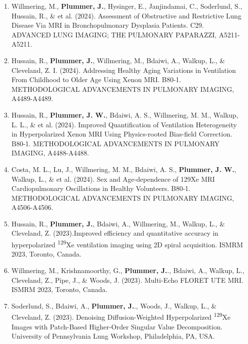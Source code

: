 \documentclass[12pt,]{scrartcl}
\begin{document}
\begin{enumerate}
  \leftskip-0.13in %


  \item Willmering, M., \textbf{Plummer, J.}, Hysinger, E., Janjindamai, C., Soderlund, S., Hussain, R., \& et al. (2024). Assessment of Obstructive and Restrictive Lung Disease Via MRI in Bronchopulmonary Dysplasia Patients. C29. ADVANCED LUNG IMAGING; THE PULMONARY PAPARAZZI, A5211-A5211.

    \item Hussain, R., \textbf{Plummer, J.}, Willmering, M., Bdaiwi, A., Walkup, L., \& Cleveland, Z. I. (2024). Addressing Healthy Aging Variations in Ventilation From Childhood to Older Age Using Xenon MRI. B80-1. METHODOLOGICAL ADVANCEMENTS IN PULMONARY IMAGING, A4489-A4489.

    \item Hussain, R., \textbf{Plummer, J. W.}, Bdaiwi, A. S., Willmering, M. M., Walkup, L. L., \& et al. (2024). Improved Quantification of Ventilation Heterogeneity in Hyperpolarized Xenon MRI Using Physics-rooted Bias-field Correction. B80-1. METHODOLOGICAL ADVANCEMENTS IN PULMONARY IMAGING, A4488-A4488.

    \item Costa, M. L., Lu, J., Willmering, M. M., Bdaiwi, A. S., \textbf{Plummer, J. W.}, Walkup, L., \& et al. (2024). Sex and Age-dependence of 129Xe MRI Cardiopulmonary Oscillations in Healthy Volunteers. B80-1. METHODOLOGICAL ADVANCEMENTS IN PULMONARY IMAGING, A4506-A4506.

    \item Hussain, R., \textbf{Plummer, J.}, Bdaiwi, A., Willmering, M., Walkup, L., \& Cleveland, Z. (2023).Improved efficiency and quantitative accuracy in hyperpolarized \textsuperscript{129}Xe ventilation imaging using 2D spiral acquisition. ISMRM 2023, Toronto, Canada.
    
  \item Willmering, M., Krishnamoorthy, G., \textbf{Plummer, J.}., Bdaiwi, A., Walkup, L., Cleveland, Z., Pipe, J., \& Woods, J. (2023). Multi-Echo FLORET UTE MRI. ISMRM 2023, Toronto, Canada.

  \item Soderlund, S., Bdaiwi, A., \textbf{Plummer, J.}., Woods, J., Walkup, L., \& Cleveland, Z. (2023). Denoising Diffusion-Weighted Hyperpolarized \textsuperscript{129}Xe Images with Patch-Based Higher-Order Singular Value Decomposition. University of Pennsylvania Lung Workshop, Philadelphia, PA, USA.
  

\end{enumerate}
\end{document}
